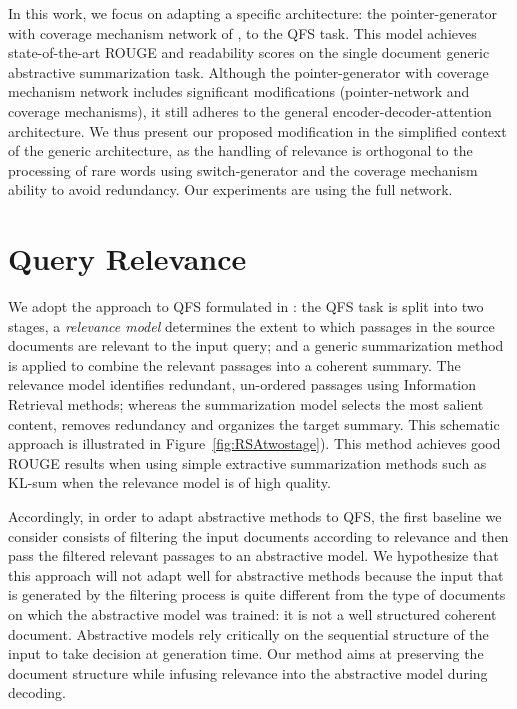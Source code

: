 \documentclass[11pt,a4paper]{article}
\begin{document}
In this work, we focus on adapting a specific architecture: the pointer-generator with coverage mechanism network of \cite{DBLP:journals/corr/SeeLM17}, to the QFS task. This model achieves state-of-the-art ROUGE \cite{lin2004rouge} and readability scores on the single document generic abstractive summarization task. 
Although the pointer-generator with coverage mechanism network includes significant modifications (pointer-network and coverage mechanisms), it still adheres to the general encoder-decoder-attention architecture. We thus present our proposed modification in the simplified context of the generic architecture, as the handling of relevance is orthogonal to the processing of rare words using switch-generator and the coverage mechanism ability to avoid redundancy.  Our experiments are using the full network.

\section{Query Relevance}

We adopt the approach to QFS formulated in \cite{baumel2016topic}: the QFS task is split into two stages, a \emph{relevance model} determines the extent to which passages in the source documents are relevant to the input query; and a generic summarization method is applied to combine the relevant passages into a coherent summary. The relevance model identifies redundant, un-ordered passages using Information Retrieval methods; 
whereas the summarization model selects the most salient content, removes redundancy and organizes the target summary.  This schematic approach is illustrated in Figure~\ref{fig:RSAtwostage}). This method achieves good ROUGE results when using simple extractive summarization methods such as KL-sum \cite{haghighi2009exploring} when the relevance model is of high quality.  

Accordingly, in order to adapt abstractive methods to QFS, the first baseline we consider consists of filtering the input documents according to relevance and then pass the filtered relevant passages to an abstractive model.  We hypothesize that this approach will not adapt well for abstractive methods because the input that is generated by the filtering process is quite different from the type of documents on which the abstractive model was trained: it is not a well structured coherent document. Abstractive models rely critically on the sequential structure of the input to take decision at generation time. Our method aims at preserving the document structure while infusing relevance into the abstractive model during decoding.
\end{document}
